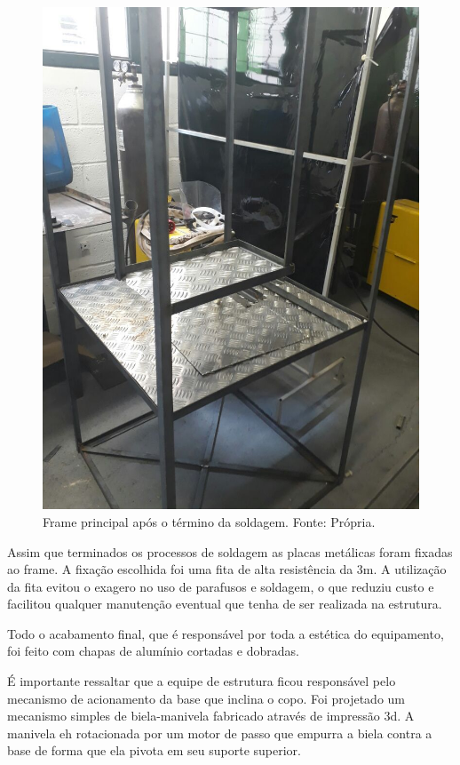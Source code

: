   \begin{figure}[H]
    \centering
    \includegraphics[scale= 0.3]{figuras/estrutura/frame-principal-soldagem.jpg}
    \caption{Frame principal após o término da soldagem. Fonte: Própria.}
    \label{modelagem}
  \end{figure}

  Assim que terminados os processos de soldagem as placas metálicas foram fixadas ao frame. 
  A fixação escolhida foi uma fita de alta resistência da 3m. A utilização da fita evitou o
  exagero no uso de parafusos e soldagem, o que reduziu custo e facilitou qualquer manutenção 
  eventual que tenha de ser realizada na estrutura.

  Todo o acabamento final, que é responsável por toda a estética do equipamento, 
  foi feito com chapas de alumínio cortadas e dobradas. 

  É importante ressaltar que a equipe de estrutura ficou responsável pelo mecanismo de 
  acionamento da base que inclina o copo. Foi projetado um mecanismo simples de biela-manivela 
  fabricado através de impressão 3d. A manivela eh rotacionada por um motor de passo que empurra a 
  biela contra a base de forma que ela pivota em seu suporte superior.

